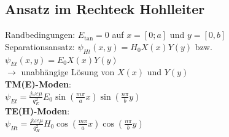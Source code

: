 \documentclass[english]{latex4ei/latex4ei_sheet}
\begin{document}
\begin{sectionbox}
    \subsection{Ansatz im Rechteck Hohlleiter}
    Randbedingungen: $E_{\text{tan}} = 0$ auf $x = [0;a]$ und $y = [0,b]$\\
    Separationsansatz: $\psi_{H t}(x, y)=H_{0} X(x) Y(y)$ bzw. $\psi_{E t}(x, y)=E_{0} X(x) Y(y)$\\
    $\rightarrow$ unabhängige Lösung von $X(x)$ und $Y(y)$\\

    \textbf{TM(E)-Moden}:\\
    $\psi_{E t}=\frac{j \omega \varepsilon \mu}{q_{E}^{2}} E_{0} \sin \left(\frac{m \pi}{a} x\right) \sin \left(\frac{n \pi}{b} y\right)$\\
    \textbf{TE(H)-Moden}:\\
    $\psi_{H t}=\frac{j \omega \varepsilon \mu}{q_{H}^{2}} H_{0} \cos \left(\frac{m \pi}{a} x\right) \cos \left(\frac{n \pi}{b} y\right)$\\
\end{sectionbox}
\end{document}

